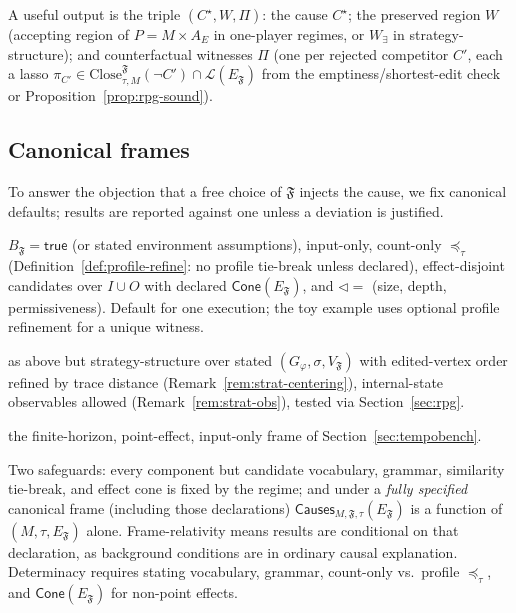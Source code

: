 \documentclass[11pt]{article}
\theoremstyle{remark}
\newcommand{\Close}{\mathrm{Close}}
\newcommand{\Lang}{\mathcal{L}}
\newcommand{\True}{\mathsf{true}}
\newcommand{\Frame}{\mathfrak{F}}
\begin{document}
A useful output is the triple \((C^\star,W,\Pi)\): the cause \(C^\star\); the
preserved region \(W\) (accepting region of \(P=M\times A_E\) in one-player regimes,
or \(W_\exists\) in strategy-structure); and counterfactual witnesses \(\Pi\)
(one per rejected competitor \(C'\), each a lasso
\(\pi_{C'}\in\Close_{\tau,M}^{\Frame}(\neg C')\cap\Lang(E_{\Frame})\) from the
emptiness/shortest-edit check or Proposition~\ref{prop:rpg-sound}).

\subsection{Canonical frames}
\label{sec:canonical-frames}

To answer the objection that a free choice of \(\Frame\) injects the cause, we fix
canonical defaults; results are reported against one unless a deviation is
justified.
\begin{description}[leftmargin=2.4cm,style=nextline]
  \item[\(\Frame_{\mathrm{trace}}\)] \(B_{\Frame}=\True\) (or stated environment
        assumptions), input-only, count-only \(\preceq_\tau\) (Definition~\ref{def:profile-refine}:
        no profile tie-break unless declared), effect-disjoint candidates over
        \(I\cup O\) with declared \(\mathsf{Cone}(E_{\Frame})\), and
        \(\triangleleft=\) (size, depth, permissiveness). Default for one execution;
        the toy example uses optional profile refinement for a unique witness.
  \item[\(\Frame_{\mathrm{strat}}\)] as above but strategy-structure over stated
        \((G_\varphi,\sigma,V_{\Frame})\) with edited-vertex order refined by trace
        distance (Remark~\ref{rem:strat-centering}), internal-state observables
        allowed (Remark~\ref{rem:strat-obs}), tested via Section~\ref{sec:rpg}.
  \item[\(\Frame_{\mathrm{TB}}\)] the finite-horizon, point-effect, input-only
        frame of Section~\ref{sec:tempobench}.
\end{description}
Two safeguards: every component but candidate vocabulary, grammar, similarity
tie-break, and effect cone is fixed by the regime; and under a \emph{fully
specified} canonical frame (including those declarations)
\(\mathsf{Causes}_{M,\Frame,\tau}(E_{\Frame})\) is a function of
\((M,\tau,E_{\Frame})\) alone. Frame-relativity means results are conditional on
that declaration, as background conditions are in ordinary causal explanation.
Determinacy requires stating vocabulary, grammar, count-only vs.\ profile
\(\preceq_\tau\), and \(\mathsf{Cone}(E_{\Frame})\) for non-point effects.
\end{document}
